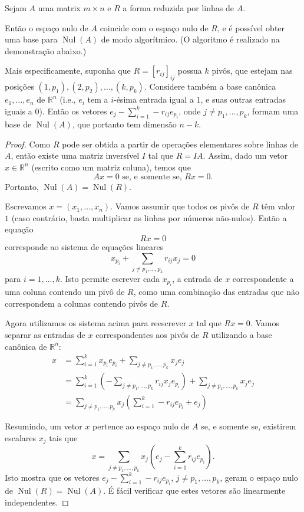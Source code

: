 \begin{theorem}
	Sejam $A$ uma matrix $m\times n$ e $R$ a forma reduzida por linhas de $A$.
	
	Então o espaço nulo de $A$ coincide com o espaço nulo de $R$, e é possível obter uma base para $\operatorname{Nul}(A)$ de modo algorítmico. (O algoritmo é realizado na demonstração abaixo.)
	
	Mais especificamente, suponha que $R=[r_{ij}]_{ij}$ possua $k$ pivôs, que estejam nas posições $(1,p_1),(2,p_2),\ldots,(k,p_k)$. Considere também a base canônica $e_1,\ldots,e_n$ de $\mathbb{R}^n$ (i.e., $e_i$ tem a $i$-ésima entrada igual a $1$, e suas outras entradas iguais a $0$). Então os vetores $e_j-\sum_{i=1}^k-r_{ij}e_{p_i}$, onde $j\neq p_1,\ldots,p_k$, formam uma base de $\operatorname{Nul}(A)$, que portanto tem dimensão $n-k$.
\end{theorem}
\begin{proof}
	Como $R$ pode ser obtida a partir de operações elementares sobre linhas de $A$, então existe uma matriz inversível $I$ tal que $R=IA$. Assim, dado um vetor $x\in\mathbb{R}^n$ (escrito como um matriz coluna), temos que
	\[Ax=0\text{ se, e somente se, }Rx=0.\]
	Portanto, $\operatorname{Nul}(A)=\operatorname{Nul}(R)$.
	
	Escrevamos $x=(x_1,\ldots,x_n)$. Vamos assumir que todos os pivôs de $R$ têm valor $1$ (caso contrário, basta multiplicar as linhas por números não-nulos). Então a equação
	\[Rx=0\]
	corresponde ao sistema de equações lineares
	\[x_{p_i}+\sum_{j\neq p_1,\ldots,p_k}r_{ij}x_j=0\]
	para $i=1,\ldots,k$. Isto permite escrever cada $x_{p_i}$, a entrada de $x$ correspondente a uma coluna contendo um pivô de $R$, como uma combinação das entradas que não correspondem a colunas contendo pivôs de $R$.
	
	Agora utilizamos os sistema acima para reescrever $x$ tal que $Rx=0$. Vamos separar as entradas de $x$ correspondentes aos pivôs de $R$ utilizando a base canônica de $\mathbb{R}^n$:
	\begin{align*}
		x&=\sum_{i=1}^k x_{p_i}e_{p_i}+\sum_{j\neq p_1,\ldots,p_k}x_je_j\\
			&=\sum_{i=1}^k\left(-\sum_{j\neq p_1,\ldots,p_k}r_{ij}x_je_{p_i}\right)+\sum_{j\neq p_1,\ldots,p_k}x_je_j\\
			&=\sum_{j\neq p_1,\ldots,p_k}x_j\left(\sum_{i=1}^k-r_{ij}e_{p_i}+e_j\right)\tag{1}
	\end{align*}
	
	Resumindo, um vetor $x$ pertence ao espaço nulo de $A$ se, e somente se, existirem escalares $x_j$ tais que
	\[x=\sum_{j\neq p_1,\ldots,p_k}x_j\left(e_j-\sum_{i=1}^kr_{ij}e_{p_i}\right).\]
	Isto mostra que os vetores $e_j-\sum_{i=1}^k-r_{ij}e_{p_i}$, $j\neq p_1,\ldots,p_k$, geram o espaço nulo de $\operatorname{Nul}(R)=\operatorname{Nul}(A)$. É fácil verificar que estes vetores são linearmente independentes.
\end{proof}